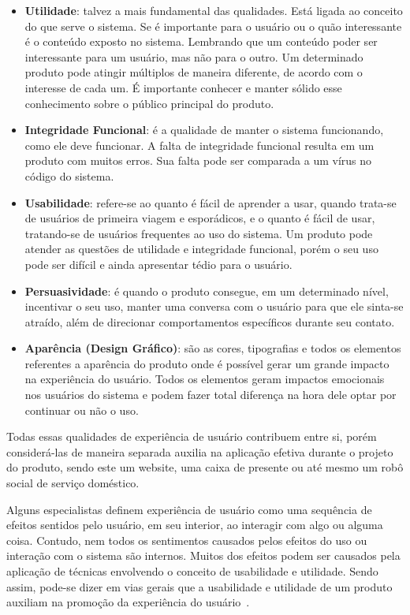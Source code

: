 \begin{itemize}
    \item \textbf{Utilidade}: talvez a mais fundamental das qualidades. Está ligada ao conceito do que serve o sistema. Se é importante para o usuário ou o quão interessante é o conteúdo exposto no sistema. Lembrando que um conteúdo poder ser interessante para um usuário, mas não para o outro. Um determinado produto pode atingir múltiplos de maneira diferente, de acordo com o interesse de cada um. É importante conhecer e manter sólido esse conhecimento sobre o público principal do produto.
    \item \textbf{Integridade Funcional}: é a qualidade de manter o sistema funcionando, como ele deve funcionar. A falta de integridade funcional resulta em um produto com muitos erros. Sua falta pode ser comparada a um vírus no código do sistema.
    \item \textbf{Usabilidade}: refere-se ao quanto é fácil de aprender a usar, quando trata-se de usuários de primeira viagem e esporádicos, e o quanto é fácil de usar, tratando-se de usuários frequentes ao uso do sistema. Um produto pode atender as questões de utilidade e integridade funcional, porém o seu uso pode ser difícil e ainda apresentar tédio para o usuário.
    \item \textbf{Persuasividade}: é quando o produto consegue, em um determinado nível, incentivar o seu uso, manter uma conversa com o usuário para que ele sinta-se atraído, além de direcionar comportamentos específicos durante seu contato.
    \item \textbf{Aparência (Design Gráfico)}: são as cores, tipografias e todos os elementos referentes a aparência do produto onde é possível gerar um grande impacto na experiência do usuário. Todos os elementos geram impactos emocionais nos usuários do sistema e podem fazer total diferença na hora dele optar por continuar ou não o uso.
\end{itemize}

Todas essas qualidades de experiência de usuário contribuem entre si, porém considerá-las de maneira separada auxilia na aplicação efetiva durante o projeto do produto, sendo este um website, uma caixa de presente ou até mesmo um robô social de serviço doméstico.

Alguns especialistas definem experiência de usuário como uma sequência de efeitos sentidos pelo usuário, em seu interior, ao interagir com algo ou alguma coisa. Contudo, nem todos os sentimentos causados pelos efeitos do uso ou interação com o sistema são internos. Muitos dos efeitos podem ser causados pela aplicação de técnicas envolvendo o conceito de usabilidade e utilidade. Sendo assim, pode-se dizer em vias gerais que a usabilidade e utilidade de um produto auxiliam na promoção da experiência do usuário~\cite{hartson:2012}.


